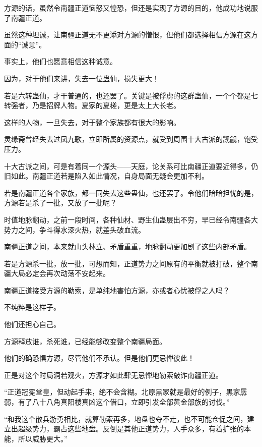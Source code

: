 
\begin{this_body}

方源的话，虽然令南疆正道恼怒又惶恐，但还是实现了方源的目的，他成功地说服了南疆正道。

虽然这种坦诚，让南疆正道无不更添对方源的憎恨，但他们都选择相信方源在这方面的“诚意”。

事实上，他们也愿意相信这种诚意。

因为，对于他们来讲，失去一位蛊仙，损失更大！

若是六转蛊仙，才干普通的，也还罢了。关键是被俘虏的这群蛊仙，一个个都是七转强者，乃是招牌人物。夏家的夏槎，更是太上大长老。

这样的人物，一旦失去，对于整个家族都有很大的影响。

灵缘斋曾经失去过凤九歌，立即所属的资源点，就受到周围十大古派的觊觎，饱受压力。

十大古派之间，可是有着同一个源头——天庭，论关系可比南疆正道要近得多，仍旧如此。南疆正道若是陷入如此情况，自身局面无疑会更加不利。

若是南疆正道各个家族，都一同失去这些蛊仙，也还罢了。令他们暗暗担忧的是，方源若是杀了一批，又放了一批呢？

时值地脉翻动，之前一段时间，各种仙材、野生仙蛊层出不穷，早已经令南疆各大势力之间，争斗得水深火热，就差头破血流。

南疆正道之间，本来就山头林立、矛盾重重，地脉翻动更加剧了这些内部矛盾。

若是方源杀一批，放一批，可想而知，正道势力之间原有的平衡就被打破，整个南疆大局必定会再次动荡不安起来。

南疆正道接受方源的勒索，是单纯地害怕方源，亦或者心忧被俘之人吗？

不纯粹是这样子。

他们还担心自己。

方源释放谁，杀死谁，已经能够改变整个南疆局面。

他们的确恐惧方源，尽管他们不承认。但是他们更忌惮彼此！

正是对这个时局洞若观火，方源才如此肆无忌惮地勒索敲诈南疆正道。

“正道冠冕堂皇，但动起手来，绝不会含糊。北原黑家就是最好的例子，黑家孱弱，有了八十八角真阳楼真凶这个借口，立即引发全部黄金部族的讨伐。”

“和我这个散兵游勇相比，就算勒索再多，地盘也夺不走，也不可能仓促之间，建立出超级势力，霸占这些地盘。反倒是其他正道势力，人手众多，有着扩张的本能，所以威胁更大。”


\end{this_body}
